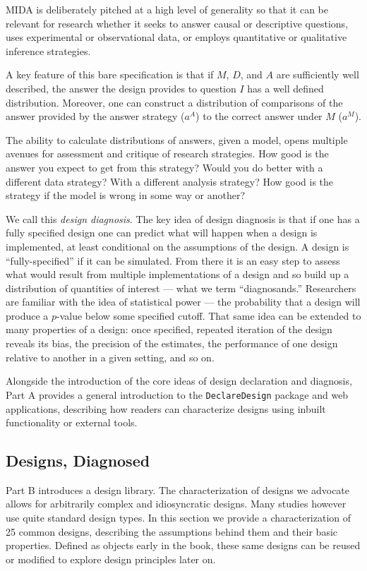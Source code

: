 \documentclass[11pt]{article}
\begin{document}
MIDA is deliberately pitched at a high level of generality so that it can be relevant for research whether it seeks to answer causal or descriptive questions, uses experimental or observational data, or employs quantitative or qualitative inference strategies.

A key feature of this bare specification is that if $M$, $D$, and $A$ are sufficiently well described, the answer the design provides to question $I$ has a well defined distribution. Moreover, one can construct a distribution of comparisons of the answer provided by the answer strategy ($a^A$) to the correct answer under $M$ ($a^M$). 

The ability to calculate distributions of answers, given a model, opens multiple avenues for assessment and critique of research strategies. How good is the answer you expect to get from this strategy? Would you do better with a different data strategy? With a different analysis strategy? How good is the strategy if the model is wrong in some way or another? 

We call this \textit{design diagnosis}. The key idea of design diagnosis is that if one has a fully specified design one can predict what will happen when a design is implemented, at least conditional on the assumptions of the design. A design is ``fully-specified'' if it can be simulated. From there it is an easy step to assess what would result from multiple implementations of a design and so build up a distribution of quantities of interest --- what we term ``diagnosands.'' Researchers are familiar with the idea of statistical power --- the probability that a design will produce a $p$-value below some specified cutoff. That same idea can be extended to many properties of a design: once specified, repeated iteration of the design reveals its bias, the precision of the estimates, the performance of one design relative to another in a given setting, and so on. 

Alongside the introduction of the core ideas of design declaration and diagnosis, Part A provides a general introduction to the \texttt{DeclareDesign} package and web applications, describing how readers can characterize designs using inbuilt functionality or external tools.


\subsection{Designs, Diagnosed}

Part B introduces a design library. The characterization of designs we advocate allows for arbitrarily complex and idiosyncratic designs. Many studies however use quite standard design types. In this section we provide a characterization of 25 common designs, describing the assumptions behind them and their basic properties. Defined as objects early in the book, these same designs can be reused or modified to explore design principles later on. 
\end{document}
